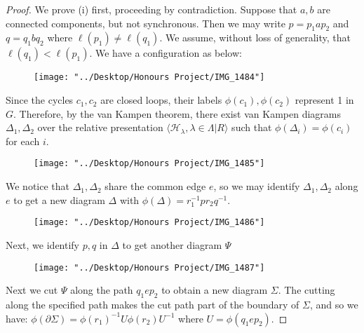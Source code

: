 \documentclass[12pt]{article}
\newcommand{\vs}{\vskip10pt}
\begin{document}
	\begin{proof}
		
		We prove (i) first, proceeding by contradiction. Suppose that $a,b$ are connected components, but not synchronous. Then we may write $p = p_1 a p_2$ and $q = q_1 b q_2$ where $\ell(p_1) \neq \ell(q_1)$. We assume, without loss of generality, that $\ell(q_1) < \ell(p_1)$. We have a configuration as below: 
		
\begin{figure}
	\centering
	\texttt{[image: "../Desktop/Honours Project/IMG\_1484"]}
	\caption{}
	\label{fig:img1484}
\end{figure}
		
		\vs
		
		Since the cycles $c_1, c_2$ are closed loops, their labels $\phi(c_1), \phi(c_2)$ represent 1 in $G$. Therefore, by the van Kampen theorem, there exist van Kampen diagrams $\Delta_1, \Delta_2$ over the relative presentation $\langle \mathcal{H}_{\lambda}, \lambda \in \Lambda \vert R \rangle$ such that $\phi(\Delta_i) = \phi(c_i)$ for each $i$. 
		
		\vs 
		
		
\begin{figure}
	\centering
	\texttt{[image: "../Desktop/Honours Project/IMG\_1485"]}
	\caption{}
	\label{fig:img1485}
\end{figure}
		
		We notice that $\Delta_1, \Delta_2$ share the common edge $e$, so we may identify $\Delta_1, \Delta_2$ along $e$ to get a new diagram $\Delta$ with $\phi(\Delta) = r_1^{-1} p r_2 q^{-1}$. 
		
\begin{figure}
	\centering
	\texttt{[image: "../Desktop/Honours Project/IMG\_1486"]}
	\caption{}
	\label{fig:img1486}
\end{figure}
		
		Next, we identify $p,q$ in $\Delta$ to get another diagram $\Psi$
		
		
\begin{figure}
	\centering
	\texttt{[image: "../Desktop/Honours Project/IMG\_1487"]}
	\caption{}
	\label{fig:img1487}
\end{figure}
		
		\vs 
		
		Next we cut $\Psi$ along the path $q_1 e p_2$ to obtain a new diagram $\Sigma$. The cutting along the specified path makes the cut path part of the boundary of $\Sigma$, and so we have: $\phi(\partial \Sigma) = \phi(r_1)^{-1} U \phi(r_2) U^{-1}$ where $U = \phi(q_1 e p_2)$. 
		

\end{proof}
\end{document}
